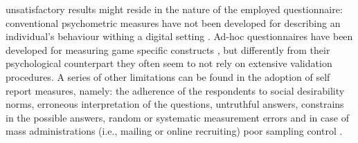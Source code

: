 unsatisfactory results might reside in the nature of the employed questionnaire: conventional psychometric measures have not been developed for describing an individual's behaviour withing a digital setting \cite{yannakakis2013player}. Ad-hoc questionnaires have been developed for measuring game specific constructs \cite{yee2006motivations,tondello2016gamification}, but differently from their psychological counterpart they often seem to not rely on extensive validation procedures. A series of other limitations can be found in the adoption of self report measures, namely: the adherence of the respondents to social desirability norms, erroneous interpretation of the questions, untruthful answers, constrains in the possible answers, random or systematic measurement errors and in case of mass administrations (i.e., mailing or online recruiting) poor sampling control \cite{van2009psychologically}.

